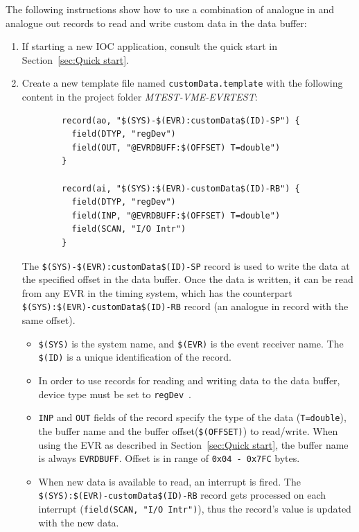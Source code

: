 \documentclass[12pt,a4paper]{article}
\begin{document}
The following instructions show how to use a combination of analogue in and analogue out records to read and write custom data in the data buffer:
\begin{enumerate}
\item If starting a new IOC application, consult the quick start in Section~\ref{sec:Quick start}.
\item Create a new template file named \texttt{customData.template} with the following content in the project folder \textit{MTEST-VME-EVRTEST}:
	\begin{verbatim}
		record(ao, "$(SYS)-$(EVR):customData$(ID)-SP") {
		  field(DTYP, "regDev")
		  field(OUT, "@EVRDBUFF:$(OFFSET) T=double")
		}
		
		record(ai, "$(SYS):$(EVR)-customData$(ID)-RB") {
		  field(DTYP, "regDev")
		  field(INP, "@EVRDBUFF:$(OFFSET) T=double")
		  field(SCAN, "I/O Intr")
		}
	\end{verbatim}
	The \texttt{\$(SYS)-\$(EVR):customData\$(ID)-SP} record is used to write the data at the specified offset in the data buffer. Once the data is written, it can be read from any EVR in the timing system, which has the counterpart \texttt{\$(SYS):\$(EVR)-customData\$(ID)-RB} record (an analogue in record with the same offset).
	\begin{itemize}
		\item 
			\texttt{\$(SYS)} is the system name, and \texttt{\$(EVR)} is the event receiver name. The \texttt{\$(ID)} is a unique identification of the record.
		\item 
			In order to use records for reading and writing data to the data buffer, device type must be set to \texttt{regDev}~\cite{regDev}.
		\item 
			\texttt{INP} and \texttt{OUT} fields of the record specify the type of the data (\texttt{T=double}), the buffer name and the buffer offset(\texttt{\$(OFFSET)}) to read/write. When using the EVR as described in Section~\ref{sec:Quick start}, the buffer name is always \texttt{EVRDBUFF}. Offset is in range of \texttt{0x04 - 0x7FC} bytes.
		\item 
			When new data is available to read, an interrupt is fired. The \texttt{\$(SYS):\$(EVR)-customData\$(ID)-RB} record gets processed on each interrupt (\texttt{field(SCAN, "I/O Intr")}), thus the record's value is updated with the new data.
	\end{itemize}


\end{enumerate}
\end{document}
